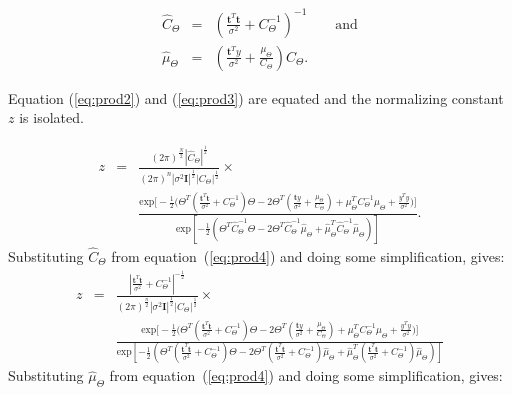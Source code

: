 \begin{eqnarray}
\label{eq:prod4}
\hat{C}_\Theta &=& \left(\frac{\textbf{t}^T\textbf{t}}{\sigma^2} + C_\Theta^{-1}\right)^{-1} \qquad \textrm{and}\\\nonumber
\hat{\mu}_\Theta &=& \left(\frac{\textbf{t}^Ty}{\sigma^2} + \frac{\mu_\Theta}{C_\Theta}\right)\hat{C}_\Theta.
\end{eqnarray}

Equation (\ref{eq:prod2}) and (\ref{eq:prod3}) are equated and the normalizing constant $z$ is isolated.

{\setlength\arraycolsep{2pt}
\begin{eqnarray}\label{eq:z1}
z &=& \frac{(2\pi)^{\frac{N}{2}}\left|\hat{C}_\Theta\right|^{\frac{1}{2}} }{(2\pi)^n |\sigma^2\textbf{I}|^{\frac{1}{2}} |C_\Theta|^{\frac{1}{2}}} \times {}\\\nonumber
& &\frac{\textrm{exp}\Bigg[-\frac{1}{2}\Bigg(\Theta^T\left(\frac{\textbf{t}^T\textbf{t}}{\sigma^2} + C_\Theta^{-1}\right)\Theta - 2 \Theta^T\left(\frac{\textbf{t}y}{\sigma^2} + \frac{\mu_\Theta}{C_\Theta}\right) + \mu_\Theta^TC_\Theta^{-1}\mu_\Theta + \frac{y^Ty}{\sigma^2}\Bigg)\Bigg]}{\textrm{exp}\left[-\frac{1}{2}\left(\Theta^T\hat{C}_\Theta^{-1}\Theta - 2\Theta^T\hat{C}_\Theta^{-1}\hat{\mu}_\Theta + \hat{\mu}_\Theta^T\hat{C}_\Theta^{-1}\hat{\mu}_\Theta \right)\right]}.
\end{eqnarray}}
Substituting $\hat{C}_\Theta$ from equation~(\ref{eq:prod4}) and doing some simplification, gives:
{\setlength\arraycolsep{2pt}
\begin{eqnarray}\label{eq:z2}
z &=& \frac{\left|\frac{\textbf{t}^T\textbf{t}}{\sigma^2} + C_\Theta^{-1}\right|^{-\frac{1}{2}}}{(2\pi)^{\frac{n}{2}} |\sigma^2\textbf{I}|^{\frac{1}{2}} |C_\Theta|^{\frac{1}{2}}} \times {}\\\nonumber
& &\frac{\textrm{exp}\Bigg[-\frac{1}{2}\Bigg(\Theta^T\left(\frac{\textbf{t}^T\textbf{t}}{\sigma^2} + C_\Theta^{-1}\right)\Theta - 2 \Theta^T\left(\frac{\textbf{t}y}{\sigma^2} + \frac{\mu_\Theta}{C_\Theta}\right) +  \mu_\Theta^TC_\Theta^{-1}\mu_\Theta + \frac{y^Ty}{\sigma^2}\Bigg)\Bigg]}{\textrm{exp}\left[-\frac{1}{2}\left(\Theta^T \left(\frac{\textbf{t}^T\textbf{t}}{\sigma^2} + C_\Theta^{-1}\right)\Theta  - 2\Theta^T\left(\frac{\textbf{t}^T\textbf{t}}{\sigma^2} + C_\Theta^{-1}\right)\hat{\mu}_\Theta  + \hat{\mu}_\Theta^T\left(\frac{\textbf{t}^T\textbf{t}}{\sigma^2} + C_\Theta^{-1}\right)\hat{\mu}_\Theta \right)\right]}
\end{eqnarray}}
Substituting $\hat{\mu}_\Theta$ from equation~(\ref{eq:prod4}) and doing some simplification, gives:

